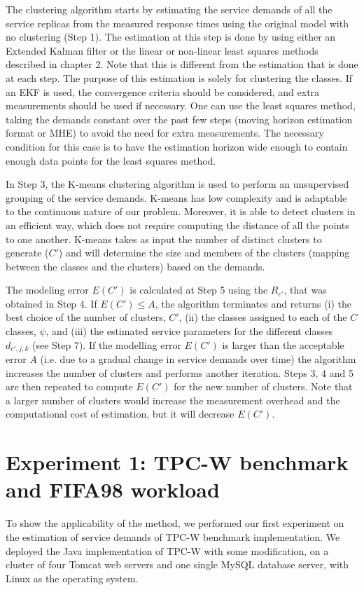 The clustering algorithm starts by estimating the service demands of all the service replicas from the measured response times using the original model with no clustering (Step 1). The estimation at this step is done by using either an Extended Kalman filter or the linear or non-linear least squares methods described in chapter 2.
Note that this is different from the estimation that is done at each step. The purpose of this estimation is solely for clustering the classes. 
If an EKF is used, the convergence criteria should be considered, and extra measurements should be used if necessary.  One can use the least squares method, taking the demands constant over the past few steps (moving horizon estimation format or MHE) to avoid the need for extra measurements. The necessary condition for this case is to have the estimation horizon wide enough to contain enough data points for the least squares method.   

In Step 3, the K-means clustering algorithm \cite{kaufman_finding_1990,likas_global_2003} is used to perform an unsupervised grouping of the service demands. K-means has low complexity and is adaptable to the continuous nature of our problem. Moreover, it is able to detect clusters in an efficient way, which does not require computing the distance of all the points to one another. K-means takes as input the number of distinct clusters to generate ($C'$) and will determine the size and members of the clusters (mapping between the classes and the clusters) based on the demands. 

The modeling error $E(C')$ is calculated at Step 5 using the $R_{c'}$, that was obtained in Step 4. If $E(C')\le A$, the algorithm terminates and returns (i) the best choice of the number of clusters, $C'$, (ii) the classes assigned to each of the $C$ classes, $\psi$, and (iii) the estimated service parameters for the different classes $d_{c',j,k}$ (see Step 7). 
 If the modelling error $E(C')$ is larger than the acceptable error $A$ (i.e. due to a gradual change in service demands over time) the algorithm increases the number of clusters and performs another iteration. Steps 3, 4 and 5 are then repeated to compute $E(C')$ for the new number of clusters. Note that a larger number of clusters would increase the measurement overhead and the computational cost of estimation, but it will decrease $E(C')$. 

\section{Experiment 1: TPC-W benchmark and FIFA98 workload}    
To show the applicability of the method, we performed our first experiment on the estimation of service demands of TPC-W benchmark \cite{garcia2003tpc} implementation. We deployed the Java implementation of TPC-W \cite{volker_turau_tpc-w_????} with some modification, on a cluster of four Tomcat web servers and one single MySQL database server, with Linux as the operating system. 

